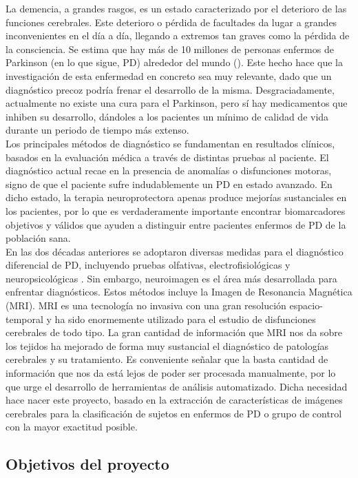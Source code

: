 La demencia, a grandes rasgos, es un estado caracterizado por el deterioro de las funciones cerebrales. Este deterioro o pérdida de facultades da lugar a grandes inconvenientes en el día a día, llegando a extremos tan graves como la pérdida de la consciencia. Se estima que hay más de 10 millones de personas enfermos de Parkinson (en lo que sigue, PD) alrededor del mundo (\cite{wp}). Este hecho hace que la investigación de esta enfermedad en concreto sea muy relevante, dado que un diagnóstico precoz podría frenar el desarrollo de la misma. Desgraciadamente, actualmente no existe una cura para el Parkinson, pero sí hay medicamentos que inhiben su desarrollo, dándoles a los pacientes un mínimo de calidad de vida durante un periodo de tiempo más extenso. \\

Los principales métodos de diagnóstico se fundamentan en resultados clínicos, basados en la evaluación médica a través de distintas pruebas al paciente. El diagnóstico actual recae en la presencia de anomalías o disfunciones motoras, signo de que el paciente sufre indudablemente un PD en estado avanzado. En dicho estado, la terapia neuroprotectora apenas produce mejorías sustanciales en los pacientes, por lo que es verdaderamente importante encontrar biomarcadores objetivos y válidos que ayuden a distinguir entre pacientes enfermos de PD de la población sana. \\

En las dos décadas anteriores se adoptaron diversas medidas para el diagnóstico diferencial de PD, incluyendo pruebas olfativas, electrofisiológicas y neuropsicológicas \cite{pruebas-ant}. Sin embargo, neuroimagen es el área más desarrollada para enfrentar diagnósticos. Estos métodos incluye la Imagen de Resonancia Magnética (MRI). MRI es una tecnología no invasiva con una gran resolución espacio-temporal y ha sido enormemente utilizado para el estudio de disfunciones cerebrales de todo tipo. La gran cantidad de información que MRI nos da sobre los tejidos ha mejorado de forma muy sustancial el diagnóstico de patologías cerebrales y su tratamiento. Es conveniente señalar que la basta cantidad de información que nos da está lejos de poder ser procesada manualmente, por lo que urge el desarrollo de herramientas de análisis automatizado. Dicha necesidad hace nacer este proyecto, basado en la extracción de características de imágenes cerebrales para la clasificación de sujetos en enfermos de PD o grupo de control con la mayor exactitud posible.

\subsection{Objetivos del proyecto}

